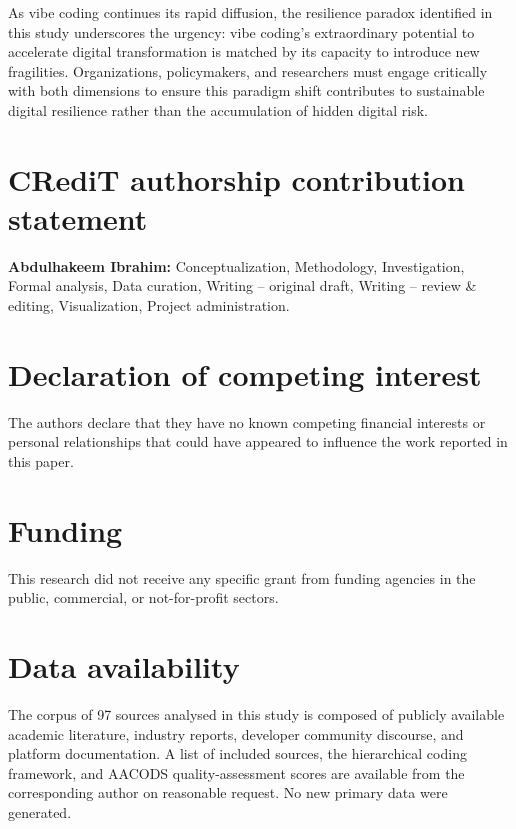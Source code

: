 \documentclass[preprint,12pt,authoryear]{elsarticle}
\begin{document}
As vibe coding continues its rapid diffusion, the resilience paradox identified in this study underscores the urgency: vibe coding's extraordinary potential to accelerate digital transformation is matched by its capacity to introduce new fragilities. Organizations, policymakers, and researchers must engage critically with both dimensions to ensure this paradigm shift contributes to sustainable digital resilience rather than the accumulation of hidden digital risk.



\section*{CRediT authorship contribution statement}

\textbf{Abdulhakeem Ibrahim:} Conceptualization, Methodology, Investigation, Formal analysis, Data curation, Writing -- original draft, Writing -- review \& editing, Visualization, Project administration.

\section*{Declaration of competing interest}

The authors declare that they have no known competing financial interests or personal relationships that could have appeared to influence the work reported in this paper.

\section*{Funding}

This research did not receive any specific grant from funding agencies in the public, commercial, or not-for-profit sectors.

\section*{Data availability}

The corpus of 97 sources analysed in this study is composed of publicly available academic literature, industry reports, developer community discourse, and platform documentation. A list of included sources, the hierarchical coding framework, and AACODS quality-assessment scores are available from the corresponding author on reasonable request. No new primary data were generated.



\end{document}
